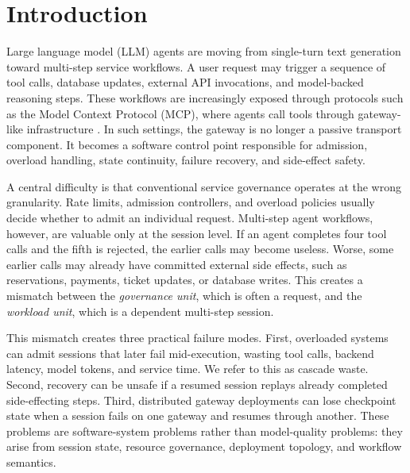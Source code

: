 \documentclass[5p,times]{elsarticle}
\begin{document}
%

\section{Introduction}
\label{sec:introduction}

Large language model (LLM) agents are moving from single-turn text generation toward multi-step service workflows. A user request may trigger a sequence of tool calls, database updates, external API invocations, and model-backed reasoning steps. These workflows are increasingly exposed through protocols such as the Model Context Protocol (MCP), where agents call tools through gateway-like infrastructure \citep{anthropic2024mcp}. In such settings, the gateway is no longer a passive transport component. It becomes a software control point responsible for admission, overload handling, state continuity, failure recovery, and side-effect safety.

A central difficulty is that conventional service governance operates at the wrong granularity. Rate limits, admission controllers, and overload policies usually decide whether to admit an individual request. Multi-step agent workflows, however, are valuable only at the session level. If an agent completes four tool calls and the fifth is rejected, the earlier calls may become useless. Worse, some earlier calls may already have committed external side effects, such as reservations, payments, ticket updates, or database writes. This creates a mismatch between the \emph{governance unit}, which is often a request, and the \emph{workload unit}, which is a dependent multi-step session.

This mismatch creates three practical failure modes. First, overloaded systems can admit sessions that later fail mid-execution, wasting tool calls, backend latency, model tokens, and service time. We refer to this as cascade waste. Second, recovery can be unsafe if a resumed session replays already completed side-effecting steps. Third, distributed gateway deployments can lose checkpoint state when a session fails on one gateway and resumes through another. These problems are software-system problems rather than model-quality problems: they arise from session state, resource governance, deployment topology, and workflow semantics.
\end{document}
